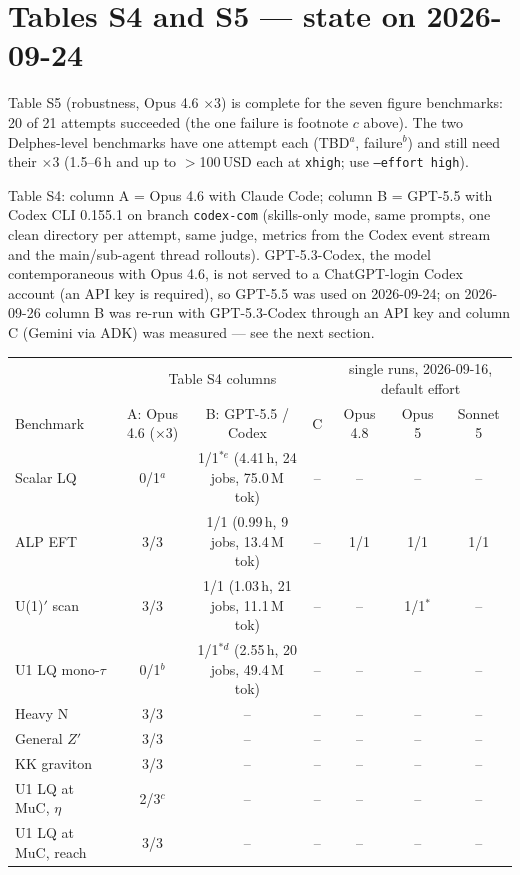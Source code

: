 \documentclass[11pt]{article}
\begin{document}
\section{Tables S4 and S5 --- state on 2026-09-24}
Table S5 (robustness, Opus 4.6 $\times$3) is complete for the seven figure benchmarks: 20 of 21 attempts succeeded (the
one failure is footnote $c$ above). The two Delphes-level benchmarks have one attempt each (TBD$^{a}$, failure$^{b}$) and
still need their $\times$3 (1.5--6\,h and up to $>$100\,USD each at \texttt{xhigh}; use \texttt{--effort high}).

Table S4: column A = Opus 4.6 with Claude Code; column B = GPT-5.5 with Codex CLI 0.155.1 on branch \texttt{codex-com}
(skills-only mode, same prompts, one clean directory per attempt, same judge, metrics from the Codex event stream and the
main/sub-agent thread rollouts). GPT-5.3-Codex, the model contemporaneous with Opus 4.6, is not served to a ChatGPT-login
Codex account (an API key is required), so GPT-5.5 was used on 2026-09-24; on 2026-09-26 column B was re-run with
GPT-5.3-Codex through an API key and column C (Gemini via ADK) was measured --- see the next section.

\begin{center}\footnotesize\setlength{\tabcolsep}{3pt}
\begin{tabular}{lccc|ccc}
\toprule
 & \multicolumn{3}{c|}{Table S4 columns} & \multicolumn{3}{c}{single runs, 2026-09-16, default effort} \\
Benchmark & A: Opus 4.6 ($\times$3) & B: GPT-5.5 / Codex & C & Opus 4.8 & Opus 5 & Sonnet 5 \\
\midrule
Scalar LQ & 0/1$^{a}$ & 1/1$^{*e}$ (4.41\,h, 24 jobs, 75.0\,M tok) & -- & -- & -- & -- \\
ALP EFT & 3/3 & 1/1 (0.99\,h, 9 jobs, 13.4\,M tok) & -- & 1/1 & 1/1 & 1/1 \\
U(1)$'$ scan & 3/3 & 1/1 (1.03\,h, 21 jobs, 11.1\,M tok) & -- & -- & 1/1$^{*}$ & -- \\
U1 LQ mono-$\tau$ & 0/1$^{b}$ & 1/1$^{*d}$ (2.55\,h, 20 jobs, 49.4\,M tok) & -- & -- & -- & -- \\
Heavy N & 3/3 & -- & -- & -- & -- & -- \\
General $Z'$ & 3/3 & -- & -- & -- & -- & -- \\
KK graviton & 3/3 & -- & -- & -- & -- & -- \\
U1 LQ at MuC, $\eta$ & 2/3$^{c}$ & -- & -- & -- & -- & -- \\
U1 LQ at MuC, reach & 3/3 & -- & -- & -- & -- & -- \\
\bottomrule
\end{tabular}
\end{center}
\end{document}
